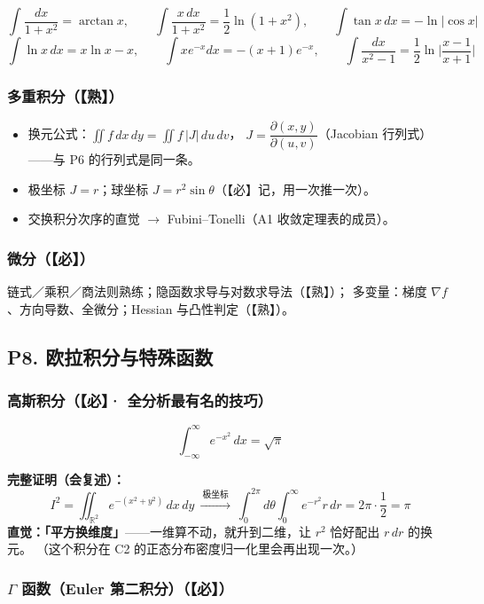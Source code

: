 \[
\int\frac{dx}{1+x^2}=\arctan x,\qquad
\int\frac{x\,dx}{1+x^2}=\frac12\ln(1+x^2),\qquad
\int\tan x\,dx=-\ln|\cos x|
\]
\[
\int\ln x\,dx=x\ln x-x,\qquad
\int xe^{-x}dx=-(x+1)e^{-x},\qquad
\int\frac{dx}{x^2-1}=\frac12\ln\Big|\frac{x-1}{x+1}\Big|
\]

\subsubsection{多重积分（【熟】）}

\begin{itemize}
  \item 换元公式：$\displaystyle\iint f\,dx\,dy=\iint f\,|J|\,du\,dv$，
        $J=\dfrac{\partial(x,y)}{\partial(u,v)}$（Jacobian 行列式）——与 P6 的行列式是同一条。
  \item 极坐标 $J=r$；球坐标 $J=r^2\sin\theta$（【必】记，用一次推一次）。
  \item 交换积分次序的直觉 $\to$ Fubini--Tonelli（A1 收敛定理表的成员）。
\end{itemize}

\subsubsection{微分（【必】）}

链式／乘积／商法则熟练；隐函数求导与对数求导法（【熟】）；
多变量：梯度 $\nabla f$、方向导数、全微分；Hessian 与凸性判定（【熟】）。

\subsection{P8. 欧拉积分与特殊函数}

\subsubsection{高斯积分（【必】· 全分析最有名的技巧）}

\[
\int_{-\infty}^{\infty}e^{-x^2}\,dx=\sqrt{\pi}
\]

\textbf{完整证明（会复述）：}
\[
I^2=\iint_{\mathbb R^2}e^{-(x^2+y^2)}\,dx\,dy
\ \xrightarrow{\ \text{极坐标}\ }\
\int_0^{2\pi}\!\!d\theta\int_0^\infty e^{-r^2}r\,dr=2\pi\cdot\frac12=\pi
\]
\textbf{直觉：「平方换维度」}——一维算不动，就升到二维，让 $r^2$ 恰好配出 $r\,dr$ 的换元。
（这个积分在 C2 的正态分布密度归一化里会再出现一次。）

\subsubsection{$\Gamma$ 函数（Euler 第二积分）（【必】）}

